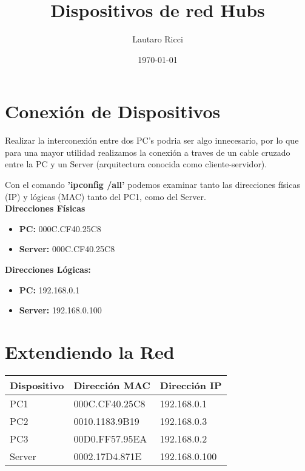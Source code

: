 \documentclass{article}
\begin{document}
	
	\title{Dispositivos de red Hubs}
	\author{Lautaro Ricci}
	\date{\today}
	
	\maketitle
	
	\section{Conexión de Dispositivos}
	
	Realizar la interconexión entre dos PC's podria ser algo innecesario, por lo que para una mayor utilidad realizamos la conexión a traves de un cable cruzado entre la PC y un Server (arquitectura conocida como cliente-servidor).
	
	Con el comando \textbf{'\textbf{ipconfig /all}'} podemos examinar tanto las direcciones físicas (IP) y lógicas (MAC) tanto del PC1, como del Server.
	\\	
	
	\textbf{Direcciones Físicas}
	\begin{itemize}
		\item \textbf{PC:} 000C.CF40.25C8
		\item \textbf{Server:} 000C.CF40.25C8
	\end{itemize}

	\textbf{Direcciones Lógicas:}
	\begin{itemize}
		\item \textbf{PC:} 192.168.0.1
		\item \textbf{Server:} 192.168.0.100
	\end{itemize}
	
	
	
	\section{Extendiendo la Red}
	\begin{table}[h!]
		\begin{tabular}{|l|l|l|}
			\hline
			\textbf{Dispositivo} & \textbf{Dirección MAC} & \textbf{Dirección IP} \\
			\hline
			PC1      & 000C.CF40.25C8 & 192.168.0.1 \\		
			\hline
			PC2      & 0010.1183.9B19 & 192.168.0.3 \\
			\hline
			PC3      & 00D0.FF57.95EA & 192.168.0.2 \\
			\hline
			Server  & 0002.17D4.871E & 192.168.0.100 \\
			\hline			
		\end{tabular}
	\end{table}
	
\end{document}
